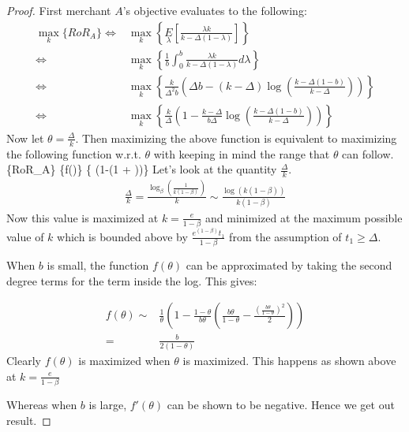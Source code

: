 \begin{proof}
First merchant $A$'s objective evaluates to the following:
\begin{align*}
\underset{k}\max\{RoR_A\} \Leftrightarrow & \underset{k}\max\left\{\underset{\lambda}E\left[\frac{\lambda k}{k-\Delta(1-\lambda)}\right]\right\}\\
                          \Leftrightarrow & \underset{k}\max\left\{ \frac{1}{b}\int_{0}^{b} \frac{\lambda k}{k-\Delta(1-\lambda)}d\lambda \right\}\\
                          \Leftrightarrow & \underset{k}\max\left\{ \frac{k}{\Delta^2 b}\left(\Delta b - (k-\Delta)\log\left(\frac{k-\Delta(1-b)}{k-\Delta}\right)\right) \right\}\\
                          \Leftrightarrow & \underset{k} \max\left\{\frac{k}{\Delta}\left(1-\frac{k-\Delta}{b\Delta}\log\left(\frac{k-\Delta(1-b)}{k-\Delta}\right)\right)\right\}
\end{align*}
Now let $\theta = \frac{\Delta}{k}$. Then maximizing the above function is equivalent to maximizing the following function w.r.t. $\theta$ with keeping in mind the range that $\theta$ can follow.
\beq
{}\max\{RoR_A\} \Leftrightarrow \underset{\theta}\max\{f(\theta)\} \Leftrightarrow \underset{\theta}\max\left\{  \left(1-\log\left(1 + \right)\right)\right\} 
\eeq
Let's look at the quantity $\frac{\Delta}{k}$.
\begin{align*}
\frac{\Delta}{k} = \frac{\log_\beta\left(\frac{1}{k(1-\beta)}\right)}{k} \sim \frac{\log(k(1-\beta))}{k(1-\beta)} 
\end{align*}
Now this value is maximized at $k = \frac{e}{1-\beta}$ and minimized at the maximum possible value of $k$ which is bounded above by $\frac{e^(1-\beta)t_1}{1-\beta}$ from the assumption of $t_1 \ge \Delta$.

When $b$ is small, the function $f(\theta)$ can be approximated by taking the second degree terms for the term inside the log. This gives:

\begin{align*}
f(\theta) \sim & \frac{1}{\theta} \left(1-\frac{1-\theta}{b\theta}\left(\frac{b\theta}{1-\theta} - \frac{\left(\frac{b\theta}{1-\theta}\right)^2}{2}\right)\right)\\
          = & \frac{b}{2(1-\theta)}
\end{align*}
Clearly $f(\theta)$ is maximized when $\theta$ is maximized. This happens as shown above at $k = \frac{e}{1-\beta}$

Whereas when $b$ is large, $f'(\theta)$ can be shown to be negative. Hence we get out result.

\end{proof}

